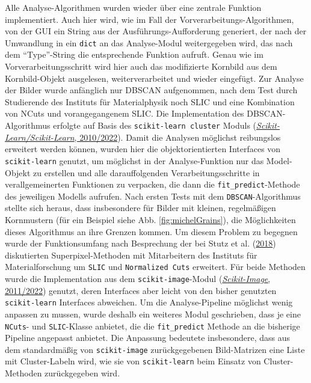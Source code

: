 \documentclass[
  12pt,
]{book}
\begin{document}
Alle Analyse-Algorithmen wurden wieder über eine zentrale Funktion implementiert. Auch hier wird, wie im Fall der Vorverarbeitungs-Algorithmen, von der GUI ein String aus der Ausführungs-Aufforderung generiert, der nach der Umwandlung in ein \texttt{dict} an das Analyse-Modul weitergegeben wird, das nach dem ``Type''-String die entsprechende Funktion aufruft. Genau wie im Vorverarbeitungsschritt wird hier auch das modifizierte Kornbild aus dem Kornbild-Objekt ausgelesen, weiterverarbeitet und wieder eingefügt.
Zur Analyse der Bilder wurde anfänglich nur DBSCAN aufgenommen, nach dem Test durch Studierende des Instituts für Materialphysik noch SLIC und eine Kombination von NCuts und vorangegangenem SLIC.
Die Implementation des DBSCAN-Algorithmus erfolgte auf Basis des \texttt{scikit-learn\ cluster} Moduls (\protect\hyperlink{ref-ScikitlearnScikitlearn2022}{\emph{Scikit-Learn/Scikit-Learn}, 2010/2022}). Damit die Analysen möglichst reibungslos erweitert werden können, wurden hier die objektorientierten Interfaces von \texttt{scikit-learn} genutzt, um möglichst in der Analyse-Funktion nur das Model-Objekt zu erstellen und alle darauffolgenden Verarbeitungsschritte in verallgemeinerten Funktionen zu verpacken, die dann die \texttt{fit\_predict}-Methode des jeweiligen Modells aufrufen.
Nach ersten Tests mit dem \texttt{DBSCAN}-Algorithmus stellte sich heraus, dass insbesondere für Bilder mit kleinen, regelmäßigen Kornmustern (für ein Beispiel siehe Abb. \ref{fig:michelGrains}), die Möglichkeiten dieses Algorithmus an ihre Grenzen kommen. Um diesem Problem zu begegnen wurde der Funktionsumfang nach Besprechung der bei Stutz et al. (\protect\hyperlink{ref-stutzSuperpixelsEvaluationStateoftheart2018}{2018}) diskutierten Superpixel-Methoden mit Mitarbeitern des Instituts für Materialforschung um \texttt{SLIC} und \texttt{Normalized\ Cuts} erweitert. Für beide Methoden wurde die Implementation aus dem \texttt{scikit-image}-Modul (\protect\hyperlink{ref-ScikitimageImageProcessing2022}{\emph{Scikit-Image}, 2011/2022}) genutzt, deren Interfaces aber leicht von den bisher genutzten \texttt{scikit-learn} Interfaces abweichen. Um die Analyse-Pipeline möglichst wenig anpassen zu mussen, wurde deshalb ein weiteres Modul geschrieben, dass je eine \texttt{NCuts}- und \texttt{SLIC}-Klasse anbietet, die die \texttt{fit\_predict} Methode an die bisherige Pipeline angepasst anbietet. Die Anpassung bedeutete insbesondere, dass aus dem standardmäßig von \texttt{scikit-image} zurückgegebenen Bild-Matrizen eine Liste mit Cluster-Labeln wird, wie sie von \texttt{scikit-learn} beim Einsatz von Cluster-Methoden zurückgegeben wird.
\end{document}
